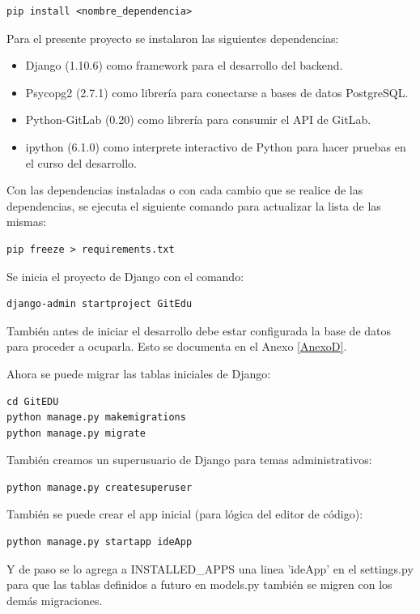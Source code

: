 \begin{lstlisting}
pip install <nombre_dependencia>
\end{lstlisting}

Para el presente proyecto se instalaron las siguientes dependencias:
\begin{itemize}
	\item Django (1.10.6) como framework para el desarrollo del backend.
    \item Psycopg2 (2.7.1) como librería para conectarse a bases de datos PostgreSQL.
    \item Python-GitLab (0.20) como librería para consumir el API de GitLab.
    \item ipython (6.1.0) como interprete interactivo de Python para hacer pruebas en el curso del desarrollo.
\end{itemize}

Con las dependencias instaladas o con cada cambio que se realice de las dependencias, se ejecuta el siguiente comando para actualizar la lista de las mismas:

\begin{lstlisting}
pip freeze > requirements.txt
\end{lstlisting}

Se inicia el proyecto de Django con el comando:

\begin{lstlisting}
django-admin startproject GitEdu
\end{lstlisting}

También antes de iniciar el desarrollo debe estar configurada la base de datos para proceder a ocuparla.  Esto se documenta en el Anexo \ref{AnexoD}.

Ahora se puede migrar las tablas iniciales de Django:
\begin{lstlisting}
cd GitEDU
python manage.py makemigrations
python manage.py migrate
\end{lstlisting}

También creamos un superusuario de Django para temas administrativos:
\begin{lstlisting}
python manage.py createsuperuser
\end{lstlisting}

También se puede crear el app inicial (para lógica del editor de código):
\begin{lstlisting}
python manage.py startapp ideApp
\end{lstlisting}

Y de paso se lo agrega a INSTALLED\_APPS una linea 'ideApp' en el settings.py para que las tablas definidos a futuro en models.py también se migren con los demás migraciones.

